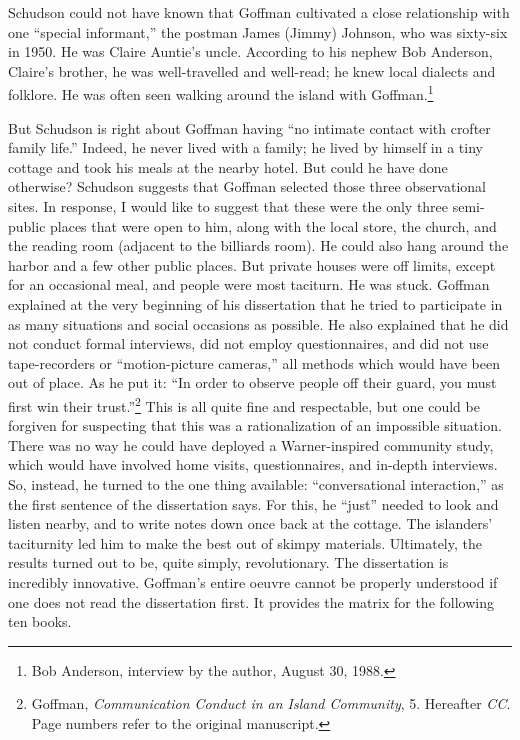 \documentclass[openany,nobib]{tufte-book}
\begin{document}
\newpage\noindent Schudson could not have known that Goffman cultivated a close
relationship with one ``special informant,'' the postman James (Jimmy)
Johnson, who was sixty-six in 1950. He was Claire Auntie's uncle.
According to his nephew Bob Anderson, Claire's brother, he was
well-travelled and well-read; he knew local dialects and folklore. He
was often seen walking around the island with Goffman.\footnote{Bob
  Anderson, interview by the author, August 30, 1988.}

But Schudson is right about Goffman having ``no intimate contact with
crofter family life.'' Indeed, he never lived with a family; he lived by
himself in a tiny cottage and took his meals at the nearby hotel. But
could he have done otherwise? Schudson suggests that Goffman selected
those three observational sites. In response, I would like to suggest
that these were the only three semi-public places that were open to him,
along with the local store, the church, and the reading room (adjacent
to the billiards room). He could also hang around the harbor and a few
other public places. But private houses were off limits, except for an
occasional meal, and people were most taciturn. He was stuck. Goffman
explained at the very beginning of his dissertation that he tried to
participate in as many situations and social occasions as possible. He
also explained that he did not conduct formal interviews, did not employ
questionnaires, and did not use tape-recorders or ``motion-picture
cameras,'' all methods which would have been out of place. As he put it:
``In order to observe people off their guard, you must first win their
trust.''\footnote{Goffman, \emph{Communication Conduct in an Island
  Community}, 5. Hereafter \emph{CC}. Page numbers refer to the original
  manuscript.} This is all quite fine and respectable, but one could be
forgiven for suspecting that this was a rationalization of an impossible
situation. There was no way he could have deployed a Warner-inspired
community study, which would have involved home visits, questionnaires,
and in-depth interviews. So, instead, he turned to the one thing
available: ``conversational interaction,'' as the first sentence of the
dissertation says. For this, he ``just'' needed to look and listen
nearby, and to write notes down once back at the cottage. The islanders'
taciturnity led him to make the best out of skimpy materials.
Ultimately, the results turned out to be, quite simply, revolutionary.
The dissertation is incredibly innovative. Goffman's entire oeuvre
cannot be properly understood if one does not read the dissertation
first. It provides the matrix for the following ten books.
\end{document}

